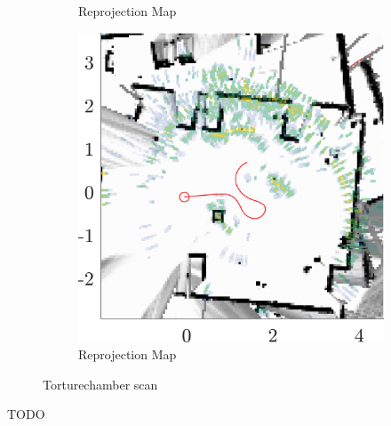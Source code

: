 \begin{figure}[htbp]
\begin{subfigure}[t]{0.475\textwidth}
        \caption{\small Reprojection Map}
    \end{subfigure}%
    \hfill%
    \begin{subfigure}[t]{0.475\textwidth}   
        \centering 
        \includegraphics[max width=\linewidth, max height=\linewidth]{gfx/results/torturechamber_map.png}
        \caption{\small Reprojection Map}
    \end{subfigure}%
    \caption{Torturechamber scan}
\end{figure}

TODO

